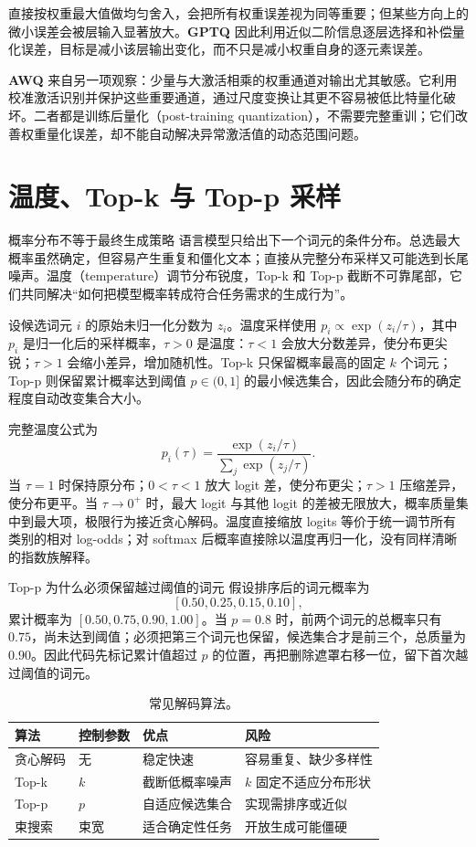 直接按权重最大值做均匀舍入，会把所有权重误差视为同等重要；但某些方向上的微小误差会被层输入显著放大。\textbf{GPTQ} 因此利用近似二阶信息逐层选择和补偿量化误差，目标是减小该层输出变化，而不只是减小权重自身的逐元素误差。

\textbf{AWQ} 来自另一项观察：少量与大激活相乘的权重通道对输出尤其敏感。它利用校准激活识别并保护这些重要通道，通过尺度变换让其更不容易被低比特量化破坏。二者都是训练后量化（post-training quantization），不需要完整重训；它们改善权重量化误差，却不能自动解决异常激活值的动态范围问题。

\section{温度、Top-k 与 Top-p 采样}
\label{sec:sampling}

\begin{motivationbox}{概率分布不等于最终生成策略}
语言模型只给出下一个词元的条件分布。总选最大概率虽然确定，但容易产生重复和僵化文本；直接从完整分布采样又可能选到长尾噪声。温度（temperature）调节分布锐度，Top-k 和 Top-p 截断不可靠尾部，它们共同解决“如何把模型概率转成符合任务需求的生成行为”。
\end{motivationbox}

设候选词元 $i$ 的原始未归一化分数为 $z_i$。温度采样使用 $p_i\propto\exp(z_i/\tau)$，其中 $p_i$ 是归一化后的采样概率，$\tau>0$ 是温度：$\tau<1$ 会放大分数差异，使分布更尖锐；$\tau>1$ 会缩小差异，增加随机性。Top-k 只保留概率最高的固定 $k$ 个词元；Top-p 则保留累计概率达到阈值 $p\in(0,1]$ 的最小候选集合，因此会随分布的确定程度自动改变集合大小。

完整温度公式为
\[
p_i(\tau)=\frac{\exp(z_i/\tau)}{\sum_j\exp(z_j/\tau)}.
\]
当 $\tau=1$ 时保持原分布；$0<\tau<1$ 放大 logit 差，使分布更尖；$\tau>1$ 压缩差异，使分布更平。当 $\tau\to0^+$ 时，最大 logit 与其他 logit 的差被无限放大，概率质量集中到最大项，极限行为接近贪心解码。温度直接缩放 logits 等价于统一调节所有类别的相对 log-odds；对 softmax 后概率直接除以温度再归一化，没有同样清晰的指数族解释。

\begin{examplebox}{Top-p 为什么必须保留越过阈值的词元}
假设排序后的词元概率为
\[
[0.50,0.25,0.15,0.10],
\]
累计概率为 $[0.50,0.75,0.90,1.00]$。当 $p=0.8$ 时，前两个词元的总概率只有 $0.75$，尚未达到阈值；必须把第三个词元也保留，候选集合才是前三个，总质量为 $0.90$。因此代码先标记累计值超过 $p$ 的位置，再把删除遮罩右移一位，留下首次越过阈值的词元。
\end{examplebox}

\begin{table}[htbp]
\centering
\small
\begin{tabularx}{0.9\textwidth}{lYYY}
\toprule
算法 & 控制参数 & 优点 & 风险\\
\midrule
贪心解码 & 无 & 稳定快速 & 容易重复、缺少多样性\\
Top-k & $k$ & 截断低概率噪声 & $k$ 固定不适应分布形状\\
Top-p & $p$ & 自适应候选集合 & 实现需排序或近似\\
束搜索 & 束宽 & 适合确定性任务 & 开放生成可能僵硬\\
\bottomrule
\end{tabularx}
\caption{常见解码算法。}
\end{table}

